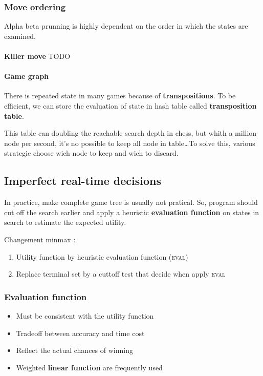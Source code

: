 \subsubsection{Move ordering}

Alpha beta prunning is highly dependent on the order in which the states are examined.

\paragraph{ }\textbf{Killer move} TODO


\paragraph{Game graph} There is repeated state in many games because of \textbf{transpositions}.
To be efficient, we can store the evaluation of state in hash table called \textbf{transposition
table}.

This table can doubling the reachable search depth in chess, but whith a million node per second,
it's no possible to keep all node in table\ldots To solve this, various strategie
choose wich node to keep and wich to discard.

\subsection{Imperfect real-time decisions}
In practice, make complete game tree is usually not pratical.
So, program should cut off the search earlier and apply a heuristic \textbf{evaluation
function} on states in search to estimate the expected utility.

Changement minmax :
\begin{enumerate}
    \item Utility function by heuristic evaluation function (\textsc{eval})
    \item Replace terminal set by a cuttoff test that decide when apply \textsc{eval}
\end{enumerate}

\subsubsection{Evaluation function}
\begin{itemize}
    \item Must be consistent with the utility function
    \item Tradeoff between accuracy and time cost
    \item Reflect the actual chances of winning
    \item Weighted \textbf{linear function} are frequently used
\end{itemize}

